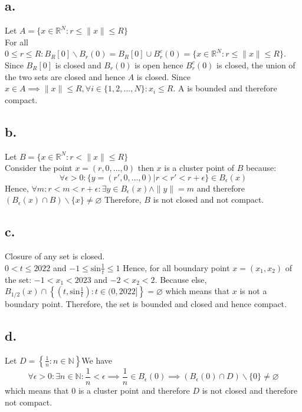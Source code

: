 \documentclass[11pt]{article}
\begin{document}
\subsection*{a.} 
Let $A = \{x \in \mathbb{R}^N: r \le \|x\| \le R\}$ \\
For all $0 \le r \le R : B_R[0] \backslash B_r(0) = B_R[0] \cup B_r^c(0) = \{x \in \mathbb{R}^N: r \le \|x\| \le R\}$. \\
Since $B_R[0]$ is closed and $B_r(0)$ is open hence $B^c_r(0)$ is closed, the union of the two sets are closed and hence $A$ is closed.
Since $x \in A \implies \|x\| \le R, \forall i \in \{1,2,\ldots,N\}: x_i \le R$. A is bounded and therefore compact.
\subsection*{b.}
Let $B = \{x \in \mathbb{R}^N: r < \|x\| \le R\}$ \\
Consider the point $x = (r,0,\ldots,0)$ then $x$ is a cluster point of $B$ because:
\[
\forall \epsilon >0: \{y = (r',0,\ldots,0) |r<r'<r + \epsilon\} \in B_\epsilon(x) 
\]
Hence, $\forall m: r<m<r+\epsilon :\exists y \in B_\epsilon(x) \land \|y\| = m$ and therefore \\$(B_\epsilon(x) \cap B) \backslash \{x\} \ne \varnothing$ 
Therefore, $B$ is not closed and not compact.\\
\subsection*{c.}
Closure of any set is closed. \\
$0<t\le 2022$ and $-1 \le \text{sin}\frac{1}{t}\le 1$
Hence, for all boundary point $x = (x_1,x_2)$ of the set: $-1<x_1<2023$ and $-2<x_2<2$. Because else, $B_{1/2}(x) \cap \left\{ \left(t,\text{sin} \frac{1}{t} \right): t \in (0,2022]\right\} = \varnothing$ which means that $x$ is not a boundary point. Therefore, the set is bounded and closed and hence compact.
\subsection*{d.}
Let $D = \left\{\frac{1}{n}: n \in \mathbb{N} \right\}$We have 
\[
\forall \epsilon >0: \exists n \in \mathbb{N}: \frac{1}{n} < \epsilon \implies \frac{1}{n} \in B_\epsilon(0) \implies (B_\epsilon(0) \cap D) \backslash \{0\}\ne \varnothing 
\]
which means that 0 is a cluster point and therefore $D$ is not closed and therefore not compact. \\
\end{document}
